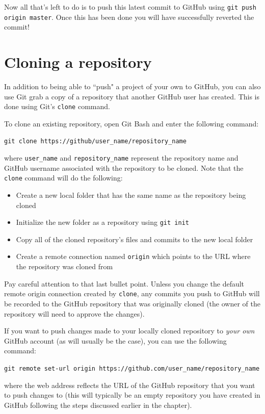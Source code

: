 \documentclass{book}
\begin{document}
 Now all that's left to do is to push this latest commit to GitHub using \texttt{git push origin master}. Once this has been done you will have successfully reverted the commit!

\section{Cloning a repository}
In addition to being able to ``push" a project of your own to GitHub, you can also use Git grab a copy of a repository that another GitHub user has created. This is done using Git's \texttt{clone} command.

To clone an existing repository, open Git Bash and enter the following command:

\texttt{git clone https://github/user\_name/repository\_name}

where \texttt{user\_name} and \texttt{repository\_name} represent the repository name and GitHub username associated with the repository to be cloned. Note that the \texttt{clone} command will do the following:

\begin{itemize}
	\item Create a new local folder that has the same name as the repository being cloned
	\item Initialize the new folder as a repository using \texttt{git init}
	\item Copy all of the cloned repository's files and commits to the new local folder
	\item Create a remote connection named \texttt{origin} which points to the URL where the repository was cloned from
\end{itemize}

Pay careful attention to that last bullet point. Unless you change the default remote origin connection created by \texttt{clone}, any commits you push to GitHub will be recorded to the GitHub repository that was originally cloned (the owner of the repository will need to approve the changes). 

If you want to push changes made to your locally cloned repository to \textit{your own} GitHub account (as will usually be the case), you can use the following command:

\texttt{git remote set-url origin https://github.com/user\_name/repository\_name}

where the web address reflects the URL of the GitHub repository that you want to push changes to (this will typically be an empty repository you have created in GitHub following the steps discussed earlier in the chapter).
\end{document}
